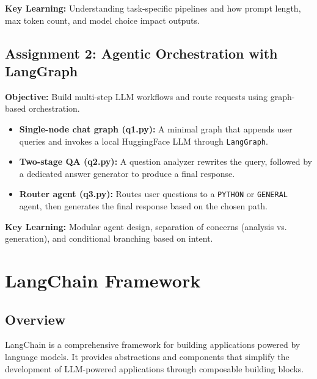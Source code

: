 \documentclass[11pt]{article}
\begin{document}
\textbf{Key Learning:} Understanding task-specific pipelines and how prompt length, max token count, and model choice impact outputs.

\subsection{Assignment 2: Agentic Orchestration with LangGraph}
\textbf{Objective:} Build multi-step LLM workflows and route requests using graph-based orchestration.

\begin{itemize}[leftmargin=2em]
    \item \textbf{Single-node chat graph (q1.py):} A minimal graph that appends user queries and invokes a local HuggingFace LLM through \texttt{LangGraph}.
    \item \textbf{Two-stage QA (q2.py):} A question analyzer rewrites the query, followed by a dedicated answer generator to produce a final response.
    \item \textbf{Router agent (q3.py):} Routes user questions to a \texttt{PYTHON} or \texttt{GENERAL} agent, then generates the final response based on the chosen path.
\end{itemize}

\textbf{Key Learning:} Modular agent design, separation of concerns (analysis vs. generation), and conditional branching based on intent.

\section{LangChain Framework}
\subsection{Overview}
LangChain is a comprehensive framework for building applications powered by language models. It provides abstractions and components that simplify the development of LLM-powered applications through composable building blocks.
\end{document}
